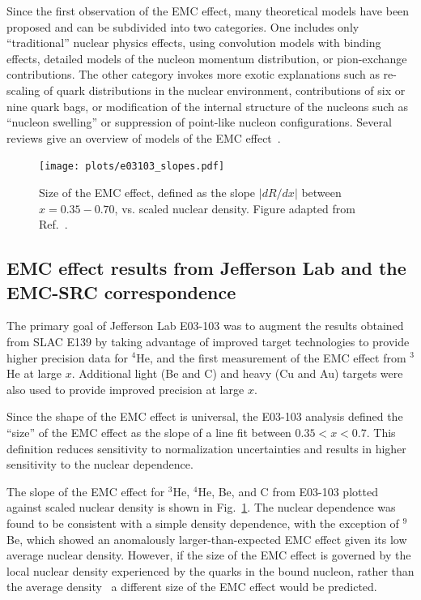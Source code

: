 Since the first observation of the EMC effect, many theoretical models have been proposed and can be subdivided into two categories.  One includes only ``traditional'' nuclear physics effects, using convolution models with binding effects, detailed models of the nucleon momentum distribution, or pion-exchange contributions. The other category invokes more exotic explanations such as re-scaling of quark distributions in the nuclear environment, contributions of six or nine
quark bags, or modification of the internal structure of the nucleons such as ``nucleon swelling'' or suppression of point-like nucleon configurations. Several reviews give an overview of models of the EMC effect~\cite{Geesaman:1995yd, Norton:2003cb, Piller:1999wx, Hen:2013oha, Malace:2014uea}.


\begin{figure}[tbp]
  \centering\texttt{[image: plots/e03103\_slopes.pdf]}
  \caption{Size of the EMC effect, defined as the slope $|dR/dx|$ between $x=0.35-0.70$, vs. scaled nuclear
    density. Figure adapted from Ref.~\cite{Seely:2009gt}.}
  \label{fig:emc_jlab_hallc}
\end{figure}

\subsection{EMC effect results from Jefferson Lab and the EMC-SRC correspondence}

The primary goal of Jefferson Lab E03-103 was to augment the results obtained from SLAC E139 by taking
advantage of improved target technologies to provide higher precision data for $^4$He, and the first
measurement of the EMC effect from $^3$He at large $x$.  Additional light (Be and C) and heavy (Cu and Au)
targets were also used to provide improved precision at large $x$.

Since the shape of the EMC effect is universal, the E03-103 analysis defined the ``size'' of the EMC
effect as the slope of a line fit between $0.35<x<0.7$.  This definition reduces sensitivity to
normalization uncertainties and results in higher sensitivity to the nuclear dependence.

The slope of the EMC effect for $^3$He, $^4$He, Be, and C from E03-103 plotted against scaled nuclear
density is shown in Fig.~\ref{fig:emc_jlab_hallc}.  The nuclear dependence was found to be consistent
with a simple density dependence, with the exception of $^9$Be,  which showed an anomalously larger-than-expected 
EMC effect given its low average nuclear density.  However, if the size of the EMC effect is
governed by the local nuclear density experienced by the quarks in the bound nucleon, rather than the
average density~\cite{Seely:2009gt, PhysRevC.82.054614} a different size of the EMC effect would be predicted.

